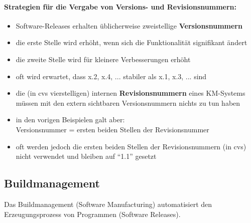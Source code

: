 \paragraph{Strategien für die Vergabe von Versions- und Revisionsnummern:}
\begin{itemize}
	\item Software-Releases erhalten üblicherweise zweistellige \textbf{Versionsnummern}
	\item die erste Stelle wird erhöht, wenn sich die Funktionalität signifikant ändert
	\item die zweite Stelle wird für kleinere Verbesserungen erhöht
	\item oft wird erwartet, dass  x.2, x.4, ...  stabiler als  x.1, x.3, ... sind
	\item die (in cvs vierstelligen) internen \textbf{Revisionsnummern} eines KM-Systems müssen mit den extern sichtbaren Versionsnummern nichts zu tun haben
	\item in den vorigen Beispielen galt aber: \\
	Versionsnummer = ersten beiden Stellen der Revisionsnummer
	\item oft werden jedoch die ersten beiden Stellen der Revisionsnummern 
	(in cvs) nicht verwendet und bleiben auf ``1.1'' gesetzt
\end{itemize}
\subsection{Buildmanagement}
Das Buildmanagement (Software Manufacturing) automatisiert den Erzeugungsprozess von Programmen (Software Releases).
